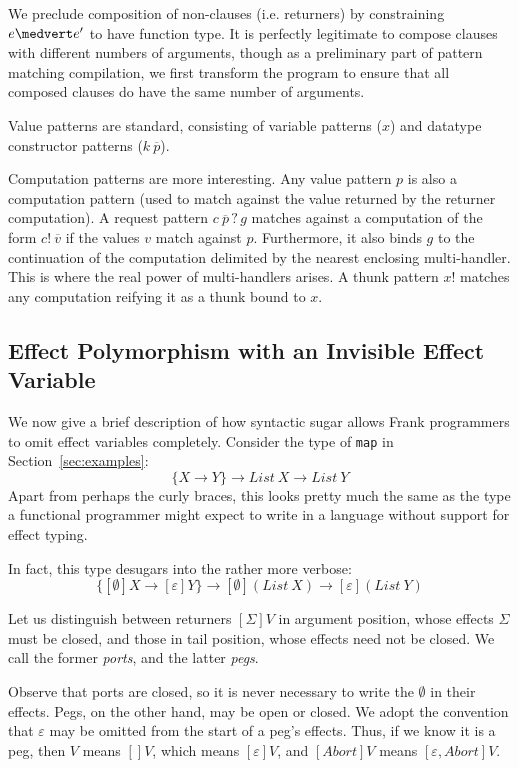 \documentclass[preprint]{sigplanconf}
\newcommand{\many}{\overline}
\newcommand{\sigs}{\Sigma}
\newcommand{\effbox}[1]{[#1]}
\newcommand{\var}{\mathit}
\newcommand{\handleSymbol}{\mathbin{?}}
\newcommand{\handle}[2]{{#1} \handleSymbol {#2}}
\newcommand{\thunk}[1]{\{{#1}\}}
\newcommand{\force}[1]{{#1}!}
\begin{document}
We preclude composition of non-clauses (i.e. returners) by
constraining $e \medvert e'$ to have function type.
%
It is perfectly legitimate to compose clauses with different numbers
of arguments, though as a preliminary part of pattern matching
compilation, we first transform the program to ensure that all
composed clauses do have the same number of arguments.

Value patterns are standard, consisting of variable patterns ($x$) and
datatype constructor patterns ($k~\many{p}$).

Computation patterns are more interesting. Any value pattern $p$ is
also a computation pattern (used to match against the value returned
by the returner computation).
%
A request pattern $\handle{c~\many{p}}{g}$ matches against a
computation of the form $\force{c}~\many{v}$ if the values $v$ match
against $p$. Furthermore, it also binds $g$ to the continuation of the
computation delimited by the nearest enclosing multi-handler. This is
where the real power of multi-handlers arises. A thunk pattern
$\force{x}$ matches any computation reifying it as a thunk bound to
$x$.


\subsection{Effect Polymorphism with an Invisible Effect Variable}

We now give a brief description of how syntactic sugar allows Frank
programmers to omit effect variables completely.
%
Consider the type of \verb!map! in Section~\ref{sec:examples}:
\[
\thunk{X \to Y} \to \var{List~X} \to \var{List~Y}
\]
Apart from perhaps the curly braces, this looks pretty much the same
as the type a functional programmer might expect to write in a
language without support for effect typing.

In fact, this type desugars into the rather more verbose:
\[
\thunk{\effbox{\emptyset}X \to \effbox{\varepsilon}Y}
  \to \effbox{\emptyset}(\var{List~X}) \to \effbox{\varepsilon}(\var{List~Y})
\]

Let us distinguish between returners $\effbox{\sigs}V$ in argument
position, whose effects $\sigs$ must be closed, and those in tail
position, whose effects need not be closed. We call the former
\emph{ports}, and the latter \emph{pegs}.

Observe that ports are closed, so it is never necessary to write the
$\emptyset$ in their effects. Pegs, on the other hand, may be open or
closed. We adopt the convention that $\varepsilon$ may be omitted from
the start of a peg's effects. Thus, if we know it is a peg, then $V$
means $\effbox{}V$, which means $\effbox{\varepsilon}V$, and
$\effbox{\var{Abort}}V$ means $\effbox{\varepsilon, \var{Abort}}V$.
\end{document}
